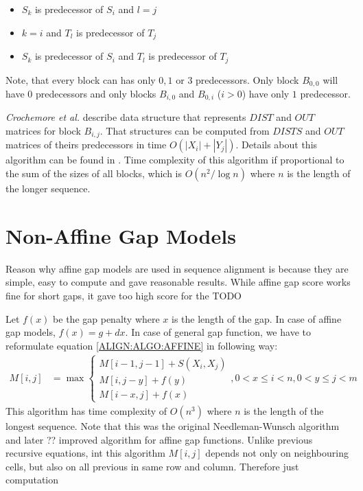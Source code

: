 
\begin{itemize}
\item $S_k$ is predecessor of $S_i$ and $l=j$
\item $k=i$ and $T_l$ is predecessor of $T_j$
\item $S_k$ is predecessor of $S_i$ and $T_l$ is predecessor of $T_j$
\end{itemize}

Note, that every block can has only $0,1$ or $3$ predecessors. Only block
$B_{0,0}$ will have $0$ predecessors and only blocks $B_{i,0}$ and $B_{0,i}$
($i>0$) have only $1$ predecessor.  

{\it Crochemore et al.} describe data structure that represents $DIST$ and $OUT$
matrices for block \nocite{Crochemore2002} $B_{i,j}$. That structures can be
computed from $DISTS$ and $OUT$ matrices of theirs predecessors in time
$O(|X_i|+|Y_j|)$. Details about this algorithm can be found in
\cite{Crochemore2002}. Time complexity of this algorithm if proportional to the
sum of the sizes of all blocks, which is $O(n^2/\log n)$ where $n$ is the length
of the longer sequence.



\section{Non-Affine Gap Models} 

Reason why affine gap models are used in sequence alignment is because they are
simple, easy to compute and gave reasonable results. While affine gap score
works fine for short gaps, it gave too high score for the TODO

Let $f(x)$ be the gap penalty where $x$ is the length of the gap. In case of
affine gap models, $f(x)=g+dx$. In case of general gap function, we have to
reformulate equation \ref{ALIGN:ALGO:AFFINE} in following way:
\begin{align}
M[i,j] &= \max
\begin{cases}
 M[i-1,j-1]+S(X_i,X_j)\\
 M[i,j-y]+f(y)\\
 M[i-x,j]+f(x)
\end{cases}, 0<x\leq i<n,0<y\leq j<m
\end{align}
This algorithm has time complexity of $O(n^3)$ where $n$ is the length of the
longest sequence. Note that this was the original Needleman-Wunsch\cite{}
algorithm and later ?? improved algorithm for affine gap functions\cite{}.
Unlike previous recursive equations, int this algorithm $M[i,j]$ depends not
only on neighbouring cells, but also on all previous in same row and column.
Therefore just computation 

